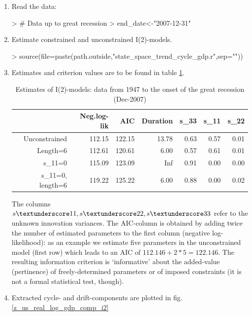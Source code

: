 \documentclass[a4paper]{book}
\begin{document}
\begin{enumerate}
\item Read the data:
\begin{Schunk}
\begin{Sinput}
> # Data up to great recession
> end_date<-"2007-12-31"
\end{Sinput}
\end{Schunk}
\item Estimate constrained and unconstrained I(2)-models.  
\begin{Schunk}
\begin{Sinput}
> source(file=paste(path.outside,"state_space_trend_cycle_gdp.r",sep=""))
\end{Sinput}
\end{Schunk}

\item Estimates and criterion values are to be found in table \ref{z_ss_uc0_t_gr_i2}.
\begin{table}[ht]
\centering
\begin{tabular}{rrrrrrr}
  \hline
 & Neg.log-lik & AIC & Duration & s\_33 & s\_11 & s\_22 \\ 
  \hline
Unconstrained & 112.15 & 122.15 & 13.78 & 0.63 & 0.57 & 0.01 \\ 
  Length=6 & 112.61 & 120.61 & 6.00 & 0.57 & 0.61 & 0.01 \\ 
  s\_11=0 & 115.09 & 123.09 & Inf & 0.91 & 0.00 & 0.00 \\ 
  s\_11=0, length=6 & 119.22 & 125.22 & 6.00 & 0.88 & 0.00 & 0.02 \\ 
   \hline
\end{tabular}
\caption{Estimates of I(2)-models: data from 1947 to the onset of the great recession (Dec-2007)} 
\label{z_ss_uc0_t_gr_i2}
\end{table}The columns $s \textunderscore 11, s \textunderscore 22, s \textunderscore 33$ refer to the unknown innovation variances. The AIC-column is obtained by adding twice the number of estimated parameters to the first column (negative log-likelihood): as an example we estimate five parameters in the unconstrained model (first row) which leads to an AIC of $112.146+2*5=122.146$. The resulting information criterion is `informative' about the added-value (pertinence) of freely-determined parameters or of imposed constraints (it is not a formal statistical test, though).
\item Extracted cycle- and drift-components are plotted in fig.\ref{z_us_real_log_gdp_comp_i2}


\end{enumerate}
\end{document}
